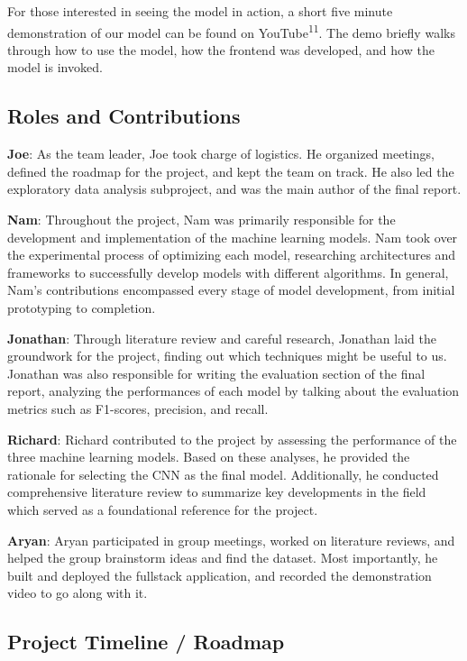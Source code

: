 \documentclass[conference]{IEEEtran}
\begin{document}
For those interested in seeing the model in action, a short five minute demonstration of our model can be found on YouTube\textsuperscript{11}. The demo briefly walks through how to use the model, how the frontend was developed, and how the model is invoked.

\subsection{\large Roles and Contributions}
\balance

\textbf{Joe}: As the team leader, Joe took charge of logistics. He organized meetings, defined the roadmap for the project, and kept the team on track. He also led the exploratory data analysis subproject, and was the main author of the final report. 

\textbf{Nam}: Throughout the project, Nam was primarily responsible for the development and implementation of the machine learning models. Nam took over the experimental process of optimizing each model, researching architectures and frameworks to successfully develop models with different algorithms. In general, Nam's contributions encompassed every stage of model development, from initial prototyping to completion.

\textbf{Jonathan}: Through literature review and careful research, Jonathan laid the groundwork for the project, finding out which techniques might be useful to us. Jonathan was also responsible for writing the evaluation section of the final report, analyzing the performances of each model by talking about the evaluation metrics such as F1-scores, precision, and recall.

\textbf{Richard}: Richard contributed to the project by assessing the performance of the three machine learning models. Based on these analyses, he provided the rationale for selecting the CNN as the final model. Additionally, he conducted comprehensive literature review to summarize key developments in the field which served as a foundational reference for the project. 

\textbf{Aryan}: Aryan participated in group meetings, worked on literature reviews, and helped the group brainstorm ideas and find the dataset. Most importantly, he built and deployed the fullstack application, and recorded the demonstration video to go along with it. 

\subsection{\large Project Timeline / Roadmap}
\end{document}
